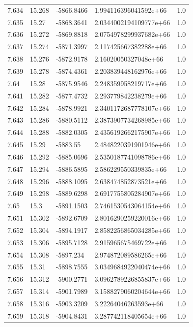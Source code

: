 \begin{tabular}{lllll}
7.634 & 15.268 & -5866.8466 & 1.994116396041592e+66 & 1.0 \\
7.635 & 15.27 & -5868.3641 & 2.0344002194109777e+66 & 1.0 \\
7.636 & 15.272 & -5869.8818 & 2.0754978299937682e+66 & 1.0 \\
7.637 & 15.274 & -5871.3997 & 2.117425667382288e+66 & 1.0 \\
7.638 & 15.276 & -5872.9178 & 2.16020050327048e+66 & 1.0 \\
7.639 & 15.278 & -5874.4361 & 2.203839448162976e+66 & 1.0 \\
7.64 & 15.28 & -5875.9546 & 2.248359958219717e+66 & 1.0 \\
7.641 & 15.282 & -5877.4732 & 2.293779842238279e+66 & 1.0 \\
7.642 & 15.284 & -5878.9921 & 2.3401172687778107e+66 & 1.0 \\
7.643 & 15.286 & -5880.5112 & 2.3873907734268985e+66 & 1.0 \\
7.644 & 15.288 & -5882.0305 & 2.4356192662175907e+66 & 1.0 \\
7.645 & 15.29 & -5883.55 & 2.4848220391901946e+66 & 1.0 \\
7.646 & 15.292 & -5885.0696 & 2.5350187741098786e+66 & 1.0 \\
7.647 & 15.294 & -5886.5895 & 2.586229550339835e+66 & 1.0 \\
7.648 & 15.296 & -5888.1095 & 2.638474852873521e+66 & 1.0 \\
7.649 & 15.298 & -5889.6298 & 2.6917755805284907e+66 & 1.0 \\
7.65 & 15.3 & -5891.1503 & 2.7461530543064154e+66 & 1.0 \\
7.651 & 15.302 & -5892.6709 & 2.8016290259220016e+66 & 1.0 \\
7.652 & 15.304 & -5894.1917 & 2.8582256865034285e+66 & 1.0 \\
7.653 & 15.306 & -5895.7128 & 2.915965675469722e+66 & 1.0 \\
7.654 & 15.308 & -5897.234 & 2.974872089586265e+66 & 1.0 \\
7.655 & 15.31 & -5898.7555 & 3.0349684922040474e+66 & 1.0 \\
7.656 & 15.312 & -5900.2771 & 3.0962789226855837e+66 & 1.0 \\
7.657 & 15.314 & -5901.7989 & 3.1588279060204644e+66 & 1.0 \\
7.658 & 15.316 & -5903.3209 & 3.22264046263593e+66 & 1.0 \\
7.659 & 15.318 & -5904.8431 & 3.287742118405654e+66 & 1.0 \\

\end{tabular}
